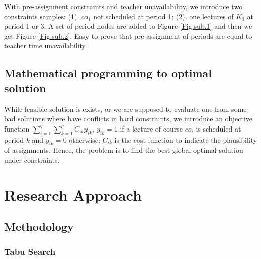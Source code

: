 \documentclass{article}
\begin{document}
With pre-assignment constraints and teacher unavailability, we introduce two constraints samples: (1). $co_{1}$ not scheduled at period 1; (2). one lectures of $K_{3}$ at period 1 or 3. A set of period nodes are added to Figure \ref{Fig.sub.1} and then we get Figure \ref{Fig.sub.2}. Easy to prove that pre-assignment of periods are equal to teacher time unavailability.

\subsection{Mathematical programming to optimal solution}

While feasible solution is exists, or we are supposed to evaluate one from some bad solutions where have conflicts in hard constraints, we introduce an objective function $\sum_{i=1}^{q} \sum_{k=1}^{p} C_{i k} y_{i k}$, $y_{i k}=1$ if a lecture of course $co_{i}$ is scheduled at period $k$ and $y_{i k}=0$ otherwise; $C_{ik}$ is the cost function to indicate the plausibility of assignments. Hence, the problem is to find the best global optimal solution under constraints.

\newpage

\section{Research Approach}
\label{sec: Research Approach}

\subsection{Methodology}

\subsubsection{Tabu Search}
\end{document}
